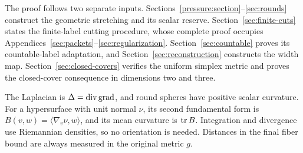The proof follows two separate inputs. Sections~\ref{pressure:section}--\ref{sec:rounds}
construct the geometric stretching and its scalar reserve.
Section~\ref{sec:finite-cuts} states the finite-label cutting procedure,
whose complete proof occupies Appendices~\ref{sec:packets}--\ref{sec:regularization}.
Section~\ref{sec:countable} proves its countable-label adaptation, and
Section~\ref{sec:reconstruction} constructs the width map.
Section~\ref{sec:closed-covers} verifies the uniform simplex metric and
proves the closed-cover consequence in dimensions two and three.

\begin{convention}\label{conv:signs}
The Laplacian is \(\Delta=\operatorname{div}\operatorname{grad}\), and round spheres have positive
scalar curvature. For a hypersurface with unit normal \(\nu\), its
second fundamental form is
\(B(v,w)=\langle\nabla_v\nu,w\rangle\), and its mean curvature is
\(\operatorname{tr} B\). Integration and divergence use Riemannian densities, so no
orientation is needed. Distances in the final fiber bound are always
measured in the original metric \(g\).
\end{convention}
